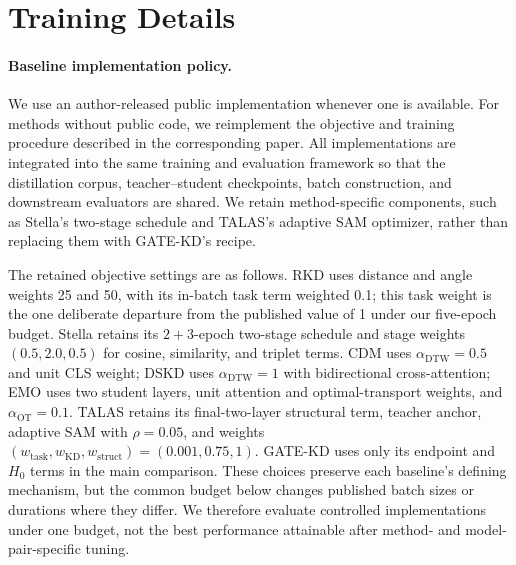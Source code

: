 \section{Training Details}
\label{app:training-hyperparameters}

\paragraph{Baseline implementation policy.}
We use an author-released public implementation whenever one is available. For
methods without public code, we reimplement the objective and training
procedure described in the corresponding paper. All implementations are
integrated into the same training and evaluation framework so that the
distillation corpus, teacher--student checkpoints, batch construction, and
downstream evaluators are shared. We retain method-specific components, such as
Stella's two-stage schedule and TALAS's adaptive SAM optimizer, rather than
replacing them with GATE-KD's recipe.

The retained objective settings are as follows. RKD uses distance and angle
weights 25 and 50, with its in-batch task term weighted 0.1; this task weight is
the one deliberate departure from the published value of 1 under our five-epoch
budget. Stella retains its $2+3$-epoch two-stage schedule and stage weights
$(0.5,2.0,0.5)$ for cosine, similarity, and triplet terms. CDM uses
$\alpha_{\mathrm{DTW}}=0.5$ and unit CLS weight; DSKD uses
$\alpha_{\mathrm{DTW}}=1$ with bidirectional cross-attention; EMO uses two
student layers, unit attention and optimal-transport weights, and
$\alpha_{\mathrm{OT}}=0.1$. TALAS retains its final-two-layer structural term,
teacher anchor, adaptive SAM with $\rho=0.05$, and weights
$(w_{\mathrm{task}},w_{\mathrm{KD}},w_{\mathrm{struct}})=(0.001,0.75,1)$.
GATE-KD uses only its endpoint and $H_0$ terms in the main comparison. These
choices preserve each baseline's defining mechanism, but the common budget
below changes published batch sizes or durations where they differ. We
therefore evaluate controlled implementations under one budget, not the best
performance attainable after method- and model-pair-specific tuning.

